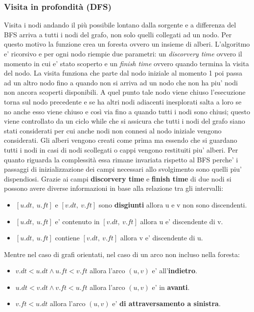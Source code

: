 \documentclass{article}
\begin{document}
\subsubsection{Visita in profondità (DFS)}
Visita i nodi andando il più possibile lontano dalla sorgente e a differenza del BFS arriva a tutti i nodi del grafo, non solo quelli collegati ad un nodo. Per questo motivo la funzione crea un foresta ovvero un insieme di alberi.
L'algoritmo e' ricorsivo e per ogni nodo riempie due parametri: un \textit{discorvery time} ovvero il momento in cui e' stato scoperto e un \textit{finish time} ovvero quando termina la visita del nodo. 
La visita funziona che parte dal nodo iniziale al momento 1 poi passa ad un altro nodo fino a quando non si arriva ad un nodo che non ha piu' nodi non ancora scoperti disponibili.
A quel punto tale nodo viene chiuso l'esecuzione torna sul nodo precedente e se ha altri nodi adiacenti inesplorati salta a loro se no anche esso viene chiuso e così via fino a quando tutti i nodi sono chiusi; 
questo viene controllato da un ciclo while che si assicura che tutti i nodi del grafo siano stati considerati per cui anche nodi non connesi al nodo iniziale vengono considerati.
Gli alberi vengono creati come prima ma essendo che si guardano tutti i nodi in casi di nodi scollegati o cappi vengono restituiti piu' alberi.
Per quanto riguarda la complessità essa rimane invariata rispetto al BFS perche' i passaggi di inizializzazione dei campi necessari allo svolgimento sono quelli piu' dispendiosi.
Grazie ai campi \textbf{discorvery time} e \textbf{finish time}  di due nodi si possono avere diverse informazioni in base alla relazione tra gli intervalli:
\begin{itemize}
    \item $[u.dt,\ u.ft]$ e $[v.dt,\ v.ft]$ sono \textbf{disgiunti} allora u e v non sono discendenti.
    \item $[u.dt,\ u.ft]$ e' contenuto in $[v.dt,\ v.ft]$ allora u e' discendente di v.
    \item $[u.dt,\ u.ft]$ contiene $[v.dt,\ v.ft]$ allora v e' discendente di u.
\end{itemize}
Mentre nel caso di grafi orientati, nel caso di un arco non incluso nella foresta:
\begin{itemize}
    \item $v.dt < u.dt \land u.ft < v.ft$ allora l'arco $(u,v)$ e' all'\textbf{indietro}. 
    \item $u.dt < v.dt \land v.ft < u.ft$ allora l'arco $(u,v)$ e' in \textbf{avanti}.
    \item $v.ft < u.dt$ allora l'arco $(u,v)$ e' \textbf{di attraversamento a sinistra}.
\end{itemize}
\end{document}
